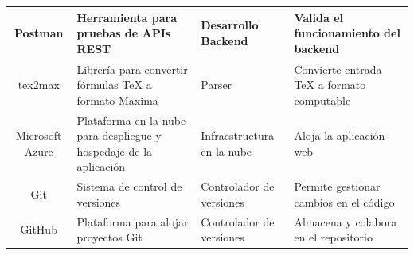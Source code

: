 \begin{longtable}{ | c | m{4.5cm} | m{3.5cm} | m{3.5cm} | }
	Postman & Herramienta para pruebas de APIs REST & Desarrollo Backend & Valida el funcionamiento del backend \\ \hline
	
	tex2max & Librería para convertir fórmulas TeX a formato Maxima & Parser & Convierte entrada TeX a formato computable \\ \hline
	
	Microsoft Azure & Plataforma en la nube para despliegue y hospedaje de la aplicación & Infraestructura en la nube & Aloja la aplicación web \\ \hline
	
	Git & Sistema de control de versiones & Controlador de versiones & Permite gestionar cambios en el código \\ \hline
	
	GitHub & Plataforma para alojar proyectos Git & Controlador de versiones & Almacena y colabora en el repositorio \\ \hline
	
\end{longtable}
 \label{tabla:tabla de tecnologías}
\vspace{0.5cm}

%
\newpage

